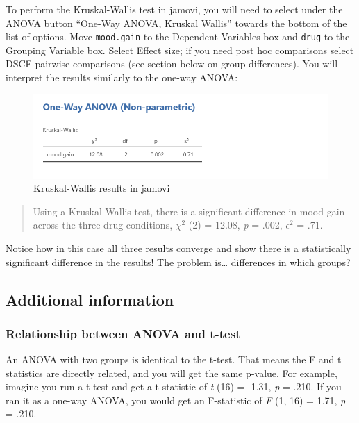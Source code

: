 \documentclass[
]{book}
\begin{document}
To perform the Kruskal-Wallis test in jamovi, you will need to select under the ANOVA button ``One-Way ANOVA, Kruskal Wallis'' towards the bottom of the list of options. Move \texttt{mood.gain} to the Dependent Variables box and \texttt{drug} to the Grouping Variable box. Select Effect size; if you need post hoc comparisons select DSCF pairwise comparisons (see section below on group differences). You will interpret the results similarly to the one-way ANOVA:

\begin{figure}

{\centering \includegraphics[width=1\linewidth]{images/04_one-way-anova/one-way_results_Kruskal} 

}

\caption{Kruskal-Wallis results in jamovi}\label{fig:unnamed-chunk-6}
\end{figure}

\begin{quote}
Using a Kruskal-Wallis test, there is a significant difference in mood gain across the three drug conditions, \(\chi^2\) (2) = 12.08, \emph{p} = .002, \(\epsilon^2\) = .71.
\end{quote}

Notice how in this case all three results converge and show there is a statistically significant difference in the results! The problem is\ldots{} differences in which groups?

\hypertarget{additional-information-3}{%
\subsection{Additional information}\label{additional-information-3}}

\hypertarget{relationship-between-anova-and-t-test}{%
\subsubsection{Relationship between ANOVA and t-test}\label{relationship-between-anova-and-t-test}}

An ANOVA with two groups is identical to the t-test. That means the F and t statistics are directly related, and you will get the same p-value. For example, imagine you run a t-test and get a t-statistic of \emph{t} (16) = -1.31, \emph{p} = .210. If you ran it as a one-way ANOVA, you would get an F-statistic of \emph{F} (1, 16) = 1.71, \emph{p} = .210.
\end{document}
